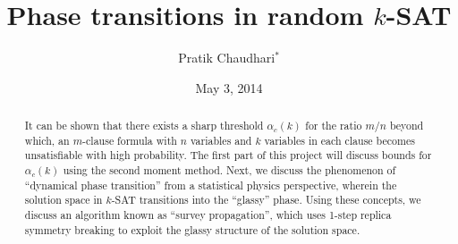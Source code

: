 \documentclass[letterpaper, 10pt, twocolumn, reqno, fleqn]{amsart}
\title{Phase transitions in random $k$-SAT}
\author{Pratik Chaudhari$^*$}
\date{May 3, 2014}
\begin{document}
\begin{abstract}
It can be shown that there exists a sharp threshold $\alpha_c(k)$ for the ratio $m/n$ beyond which, an $m$-clause formula with $n$ variables and $k$ variables in each clause becomes unsatisfiable with high probability. The first part of this project will discuss bounds for $\alpha_c(k)$ using the second moment method.
%
Next, we discuss the phenomenon of ``dynamical phase transition'' from a statistical physics perspective, wherein the solution space in $k$-SAT transitions into the ``glassy'' phase. Using these concepts, we discuss an algorithm known as ``survey propagation'', which uses 1-step replica symmetry breaking to exploit the glassy structure of the solution space.
\end{abstract}
\maketitle

\Blindtext
\end{document}
